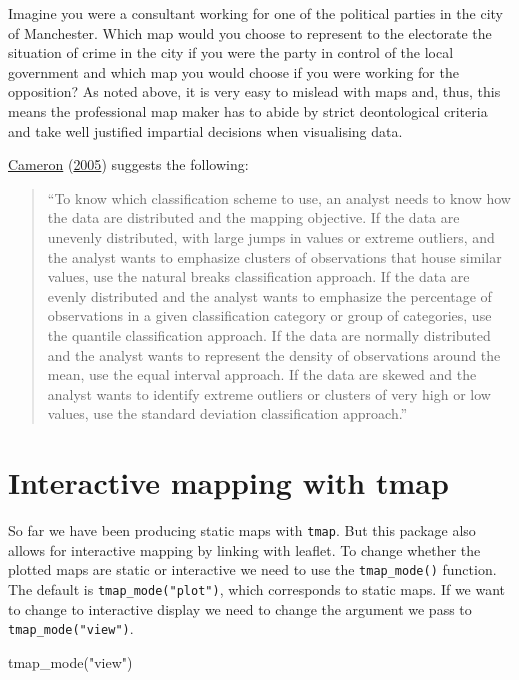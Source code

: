 \documentclass[
  krantz2]{krantz}
\makeatletter
\newenvironment{Shaded}{\begin{snugshade}}{\end{snugshade}}
\newcommand{\FunctionTok}[1]{\textcolor[rgb]{0,0,0}{#1}}
\newcommand{\NormalTok}[1]{#1}
\newcommand{\StringTok}[1]{\textcolor[rgb]{0.5,0.5,0.5}{#1}}
\newenvironment{kframe}{%
\medskip{}
\setlength{\fboxsep}{.8em}
 \def\at@end@of@kframe{}%
 \ifinner\ifhmode%
  \def\at@end@of@kframe{\end{minipage}}%
  \begin{minipage}{\columnwidth}%
 \fi\fi%
 \def\FrameCommand##1{\hskip\@totalleftmargin \hskip-\fboxsep
 \colorbox{shadecolor}{##1}\hskip-\fboxsep
     \hskip-\linewidth \hskip-\@totalleftmargin \hskip\columnwidth}%
 \MakeFramed {\advance\hsize-\width
   \@totalleftmargin\z@ \linewidth\hsize
   \@setminipage}}%
 {\par\unskip\endMakeFramed%
 \at@end@of@kframe}
\renewenvironment{Shaded}{\begin{kframe}}{\end{kframe}}
\makeatother
\begin{document}
Imagine you were a consultant working for one of the political parties in the city of Manchester. Which map would you choose to represent to the electorate the situation of crime in the city if you were the party in control of the local government and which map you would choose if you were working for the opposition? As noted above, it is very easy to mislead with maps and, thus, this means the professional map maker has to abide by strict deontological criteria and take well justified impartial decisions when visualising data.

\protect\hyperlink{ref-Cameron_2005}{Cameron} (\protect\hyperlink{ref-Cameron_2005}{2005}) suggests the following:

\begin{quote}
``To know which classification scheme to use, an analyst needs to know how the
data are distributed and the mapping objective. If the data are unevenly distributed, with large jumps in values or extreme outliers, and the analyst wants to emphasize clusters of observations that house similar values, use the natural breaks classification approach. If the data are evenly distributed and the analyst wants to emphasize the percentage of observations in a given classification category or group of categories, use the quantile classification approach. If the data are normally distributed and the analyst wants to represent the density of observations around the mean, use the equal interval approach. If the data are skewed and the analyst wants to identify extreme outliers or clusters of very high or low values, use the standard deviation classification
approach.''
\end{quote}

\hypertarget{interactive-mapping-with-tmap}{%
\section{Interactive mapping with tmap}\label{interactive-mapping-with-tmap}}

So far we have been producing static maps with \texttt{tmap}. But this package also allows for interactive mapping by linking with leaflet. To change whether the plotted maps are static or interactive we need to use the \texttt{tmap\_mode()} function. The default is \texttt{tmap\_mode("plot")}, which corresponds to static maps. If we want to change to interactive display we need to change the argument we pass to \texttt{tmap\_mode("view")}.

\begin{Shaded}
\begin{Highlighting}[]
\FunctionTok{tmap\_mode}\NormalTok{(}\StringTok{"view"}\NormalTok{)}
\end{Highlighting}
\end{Shaded}
\end{document}
